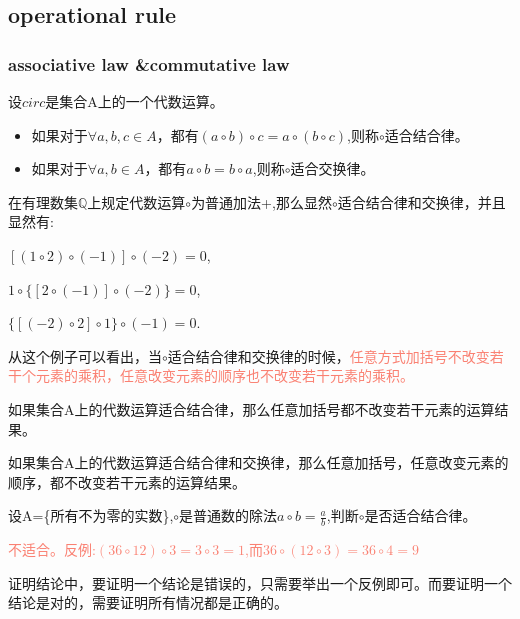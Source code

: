 \documentclass[
	11pt, %
	fleqn, %
	a4paper, %
]{LegrandOrangeBook}
\begin{document}
\subsection{operational rule}
\subsubsection{associative law \&commutative law}
\begin{theorem}
	设$circ$是集合A上的一个代数运算。
	\begin{itemize}
		\item 如果对于$\forall a,b,c\in A$，都有$(a\circ b)\circ c=a\circ(b\circ c)$,则称$\circ$适合结合律。
		\item 如果对于$\forall a,b\in A$，都有$a\circ b=b\circ a$,则称$\circ$适合交换律。
	\end{itemize}
\end{theorem}

\begin{example}
	在有理数集$\mathbb{Q}$上规定代数运算$\circ$为普通加法+,那么显然$\circ$适合结合律和交换律，并且显然有:
	\begin{center}
		$[(1\circ 2)\circ(-1)]\circ(-2)=0$,

		$1\circ\{[2\circ(-1)]\circ(-2)\}=0$,

		$\{[(-2)\circ 2]\circ 1\}\circ(-1)=0$.
	\end{center}
	从这个例子可以看出，当$\circ$适合结合律和交换律的时候，\textcolor{Salmon}{任意方式加括号不改变若干个元素的乘积，任意改变元素的顺序也不改变若干元素的乘积。}
\end{example}

\begin{theorem}
	如果集合A上的代数运算适合结合律，那么任意加括号都不改变若干元素的运算结果。
\end{theorem}

\begin{theorem}
	如果集合A上的代数运算适合结合律和交换律，那么任意加括号，任意改变元素的顺序，都不改变若干元素的运算结果。
\end{theorem}

\begin{example}
	设A=\{所有不为零的实数\},$\circ$是普通数的除法$a\circ b=\frac{a}{b}$,判断$\circ$是否适合结合律。

	\textcolor{Salmon}{不适合。反例:$(36\circ 12)\circ 3=3\circ3=1$,而$36\circ (12\circ 3)=36\circ 4=9$}

\end{example}
\begin{remark}
	证明结论中，要证明一个结论是错误的，只需要举出一个反例即可。而要证明一个结论是对的，需要证明所有情况都是正确的。
\end{remark}
\end{document}

